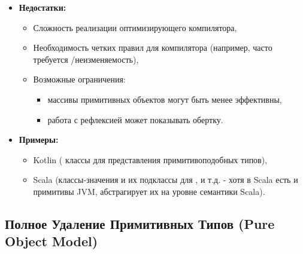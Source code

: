 \begin{itemize}[label={--}, leftmargin=*]
    \item \textbf{Недостатки:}
    \begin{itemize}
        \item Сложность реализации оптимизирующего компилятора,
        \item Необходимость четких правил для компилятора (например, часто требуется /неизменяемость),
        \item Возможные ограничения:
        \begin{itemize}
            \item массивы примитивных объектов могут быть менее эффективны,
            \item работа с рефлексией может показывать обертку.
        \end{itemize}
    \end{itemize}

    \item \textbf{Примеры:}
    \begin{itemize}
        \item Kotlin ( классы для представления примитивоподобных типов),
        \item Scala (классы-значения  и их подклассы для ,  и т.д. - хотя в Scala есть и примитивы JVM,  абстрагирует их на уровне семантики Scala).
    \end{itemize}
\end{itemize}



\subsection{Полное Удаление Примитивных Типов (Pure Object Model)}

